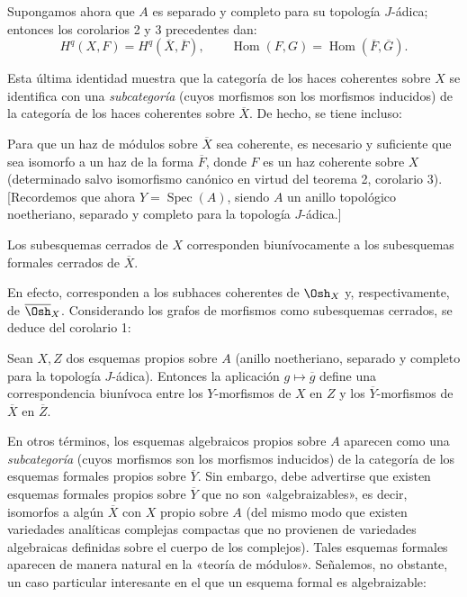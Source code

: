 Supongamos ahora que $A$ es separado y completo para su topología $J$-ádica;
entonces los corolarios 2 y 3 precedentes dan:
\[
  H^{q}(X,F)=H^{q}(\overline X,\overline F),
  \qquad
  \operatorname{Hom}(F,G)
  =\operatorname{Hom}(\overline F,\overline G).
\]

Esta última identidad muestra que la categoría de los haces coherentes sobre
$X$ se identifica con una \emph{subcategoría} (cuyos morfismos son los
morfismos inducidos) de la categoría de los haces coherentes sobre
$\overline X$. De hecho, se tiene incluso:

 Para que un haz de módulos sobre $\overline X$ sea
coherente, es necesario y suficiente que sea isomorfo a un haz de la forma
$\overline F$, donde $F$ es un haz coherente sobre $X$ (determinado salvo
isomorfismo canónico en virtud del teorema 2, corolario 3). [Recordemos que
ahora $Y=\operatorname{Spec}(A)$, siendo $A$ un anillo topológico noetheriano,
separado y completo para la topología $J$-ádica.]

 Los subesquemas cerrados de $X$ corresponden
biunívocamente a los subesquemas formales cerrados de $\overline X$.

En efecto, corresponden a los subhaces coherentes de $\Osh_X$ y,
respectivamente, de $\overline{\Osh}_X$. Considerando los grafos de morfismos
como subesquemas cerrados, se deduce del corolario 1:

 Sean $X,Z$ dos esquemas propios sobre $A$ (anillo
noetheriano, separado y completo para la topología $J$-ádica). Entonces la
aplicación $g\longmapsto\overline g$ define una correspondencia biunívoca entre
los $Y$-morfismos de $X$ en $Z$ y los $\overline Y$-morfismos de $\overline X$
en $\overline Z$.

En otros términos, los esquemas algebraicos propios sobre $A$ aparecen como una
\emph{subcategoría} (cuyos morfismos son los morfismos inducidos) de la
categoría de los esquemas formales propios sobre $\overline Y$. Sin embargo,
debe advertirse que existen esquemas formales propios sobre $\overline Y$ que
no son «algebraizables», es decir, isomorfos a algún $\overline X$ con $X$
propio sobre $A$ (del mismo modo que existen variedades analíticas complejas
compactas que no provienen de variedades algebraicas definidas sobre el cuerpo
de los complejos). Tales esquemas formales aparecen de manera natural en la
«teoría de módulos». Señalemos, no obstante, un caso particular interesante en
el que un esquema formal es algebraizable:

